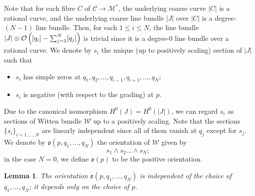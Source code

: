 \documentclass[11pt,a4paper]{article}
\newtheorem{lem}[dummy]{Lemma}
\theoremstyle{definition}
\theoremstyle{remark}
\numberwithin{equation}{section}
\begin{document}
Note that for each fibre $C$ of $\mathcal C \to \mathcal M^*$, the underlying coarse curve $\lvert C\rvert$ is a rational curve, and the underlying coarse line bundle $\lvert J\rvert$ over $\lvert C\rvert$ is a degree-$(N-1)$ line bundle. Then, for each $1\le i \le N$, the line bundle $\mathcal \lvert J\rvert\otimes \mathcal O\left([q_i]-\sum_{j=1}^N [q_j]\right)$ is trivial since it is a degree-$0$ line bundle over a rational curve.
We denote by $s_i$ the unique (up to positively scaling) section of $\lvert J\rvert$ such that 
\begin{itemize}
    \item $s_i$ has simple zeros at $q_1,q_2,\dots,q_{i-1},q_{i+1},\dots,q_{N}$;
    \item $s_i$ is negative (with respect to the grading) at $p$.
\end{itemize}
Due to the canonical isomorphism $H^0(J)=H^0(\lvert J\rvert)$, we can regard $s_i$ as sections of Witten bundle $\mathcal W$ up to a positively scaling. Note that the sections $\{s_i\}_{i= 1,\dots,N}$ are linearly independent since all of them vanish at $q_j$ except for $s_j$.  We denote by $\mathfrak o(p,q_1,\dots,q_N)$   the orientation of $\mathcal W$ given by
$$
s_1\wedge s_2\dots \wedge s_N;
$$
in the case $N=0$, we define $\mathfrak o(p)$ to be the positive orientation.

\begin{lem}
    The orientation $\mathfrak o(p,q_1,\dots,q_N)$ is independent of the choice of $q_1,\dots,q_N$; it depends only on the choice of $p$.
\end{lem}
\end{document}
